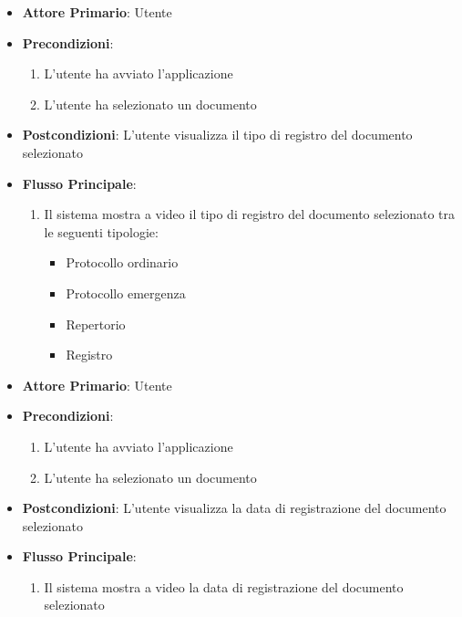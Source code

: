 \begin{itemize}
    \item \textbf{Attore Primario}: Utente
    \item \textbf{Precondizioni}:
    \begin{enumerate}
        \item L'utente ha avviato l'applicazione
        \item L'utente ha selezionato un documento
    \end{enumerate}
    \item \textbf{Postcondizioni}: L'utente visualizza il tipo di registro del documento selezionato
    \item \textbf{Flusso Principale}:
        \begin{enumerate}
            \item Il sistema mostra a video il tipo di registro 
            del documento selezionato tra le seguenti tipologie:
            \begin{itemize}
                \item Protocollo ordinario
                \item Protocollo emergenza
                \item Repertorio
                \item Registro
            \end{itemize}
        \end{enumerate}
\end{itemize}

\begin{itemize}
    \item \textbf{Attore Primario}: Utente
    \item \textbf{Precondizioni}:
    \begin{enumerate}
        \item L'utente ha avviato l'applicazione
        \item L'utente ha selezionato un documento
    \end{enumerate}
    \item \textbf{Postcondizioni}: L'utente visualizza la data di registrazione del documento selezionato
    \item \textbf{Flusso Principale}:
        \begin{enumerate}
            \item Il sistema mostra a video la data di registrazione del documento selezionato
        \end{enumerate}
\end{itemize}

